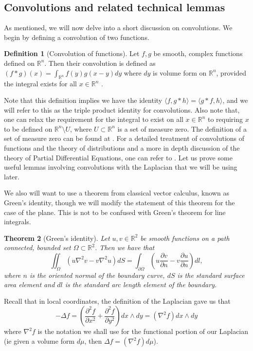 \documentclass[11pt]{report}
\newtheorem{thm}{Theorem}[section]
\theoremstyle{definition}
\newtheorem{defn}[thm]{Definition}
\begin{document}
\subsection{Convolutions and related technical lemmas}
As mentioned, we will now delve into a short discussion on convolutions. We begin by defining a convolution of two functions. 
\begin{defn}[Convolution of functions]\label{ConvolutionDefn}
  Let $f,g$ be smooth, complex functions defined on $\mathbb{R}^n$. Then their convolution is defined as $(f * g)(x) = \int_{\mathbb{R}^n}f(y)g(x-y)dy$ where $dy$ is volume form on $\mathbb{R}^n$, provided the integral exists for all $x \in \mathbb{R}^n$ .
\end{defn}
Note that this definition implies we have the identity $\langle f, g*h \rangle = \langle g*f, h \rangle$, and we will refer to this as the triple product identity for convolutions. Also note that, one can relax the requirement for the integral to exist on all $x \in \mathbb{R}^n$ to requiring $x$ to be defined on $\mathbb{R}^n\setminus{U}$, where $U \subset \mathbb{R}^n$ is a set of measure zero. The definition of a set of measure zero can be found at \cite[p.50]{spivak}.
For a detailed treatment of convolutions of functions and the theory of distributions and a more in depth discussion of the theory of Partial Differential Equations, one can refer to \cite[(Chapter 6)]{rudin}. 
Let us prove some useful lemmas involving convolutions with the Laplacian that we will be using later. 

We also will want to use a theorem from classical vector calculus, known as Green's identity, though we will modify the statement of this theorem for the case of the plane. This is not to be confused with Green's theorem for line integrals.
\begin{thm}[Green's identity]
  Let $u,v \in \mathbb{R}^2$ be smooth functions on a path connected, bounded set $\Omega \subset \mathbb{R}^2$. Then we have that  
  \[\iint_{\Omega} (u \nabla^2 v - v \nabla^2 u) dS= \int_{\partial \Omega} \left(u \frac{\partial v}{\partial n} - v \frac{\partial u}{\partial n}\right) dl, \] 
  where $n$ is the oriented normal of the boundary curve, $dS$ is the standard surface area element and $dl$ is the standard arc length element of the boundary.
\end{thm}
Recall that in local coordinates, the definition of the Laplacian gave us that \[-\Delta f = (\frac{\partial^2 f}{\partial x^2} + \frac{\partial^2 f}{\partial y^2}) dx\wedge dy = (\nabla^2f) dx\wedge dy\]
where $\nabla^2f$ is the notation we shall use for the functional portion of our Laplacian (ie given a volume form $d\mu$, then $\Delta f = (\nabla^2 f) d\mu$).
\end{document}
